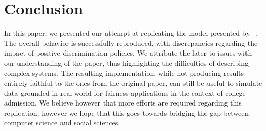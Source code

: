 \section{Conclusion}

In this paper, we presented our attempt at replicating the model presented by \citeauthor{reardon2018levels}~\cite{reardon2018levels}.
The overall behavior is successfully reproduced, with discrepancies regarding the impact of positive discrimination policies.
We attribute the later to issues with our understanding of the paper, thus highlighting the difficulties of describing complex systems.
The resulting implementation, while not producing results entirely faithful to the ones from the original paper, can still be useful to simulate data grounded in real-world for fairness applications in the context of college admission.
We believe however that more efforts are required regarding this replication, however we hope that this goes towards bridging the gap between computer science and social sciences.